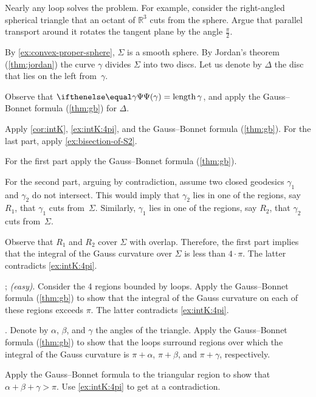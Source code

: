 \begin{multicols}{2}
Nearly any loop solves the problem.
For example, consider the right-angled spherical triangle that an octant of $\mathbb{R}^3$ cuts from the sphere.
Argue that parallel transport around it rotates the tangent plane by the angle $\tfrac\pi 2$. 

\setcounter{eqtn}{0}

By \ref{ex:convex-proper-sphere}, $\Sigma$ is a smooth sphere.
By Jordan's theorem (\ref{thm:jordan}) the curve $\gamma$ divides $\Sigma$ into two discs.
Let us denote by $\Delta$ the disc that lies on the left from~$\gamma$.

Observe that $\tgc\gamma=\length\gamma$, and apply the Gauss--Bonnet formula (\ref{thm:gb}) for $\Delta$.

Apply \ref{cor:intK}, \ref{ex:intK:4pi}, and the Gauss--Bonnet formula (\ref{thm:gb}).
For the last part, apply \ref{ex:bisection-of-S2}.

 For the first part apply the Gauss--Bonnet formula (\ref{thm:gb}).

For the second part, arguing by contradiction, assume two closed geodesics $\gamma_1$ and $\gamma_2$ do not intersect. 
This would imply that $\gamma_2$ lies in one of the regions, say $R_1$, that $\gamma_1$ cuts from~$\Sigma$.
Similarly, $\gamma_1$ lies in one of the regions, say $R_2$, that $\gamma_2$ cuts from~$\Sigma$.

Observe that $R_1$ and $R_2$ cover $\Sigma$ with overlap.
Therefore, the first part implies that the integral of the Gauss curvature over $\Sigma$ is less than $4\cdot\pi$.
The latter contradicts \ref{ex:intK:4pi}.

\parbf{\ref{ex:self-intersections}}; \textit{(easy)}.
Consider the 4 regions bounded by loops.
Apply the Gauss--Bonnet formula (\ref{thm:gb}) to show that the integral of the Gauss curvature on each of these regions exceeds $\pi$.
The latter contradicts \ref{ex:intK:4pi}.

.
Denote by $\alpha$, $\beta$, and $\gamma$ the angles of the triangle.
Apply the Gauss--Bonnet formula (\ref{thm:gb}) to show that the loops surround regions over which the integral of the Gauss curvature is $\pi+\alpha$, $\pi+\beta$, and $\pi+\gamma$, respectively.

Apply the Gauss--Bonnet formula to the triangular region to show that $\alpha+\beta+\gamma>\pi$.
Use \ref{ex:intK:4pi} to get at a contradiction.



\end{multicols}
